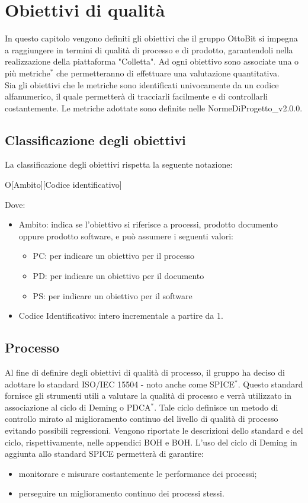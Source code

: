 \section{Obiettivi di qualità}
In questo capitolo vengono definiti gli obiettivi che il gruppo OttoBit si impegna a raggiungere in termini di qualità di processo e di prodotto, garantendoli nella realizzazione della piattaforma "Colletta". Ad ogni obiettivo sono associate una o più metriche$^*$ che permetteranno di effettuare una valutazione quantitativa. \\
Sia gli obiettivi che le metriche sono identificati univocamente da un codice alfanumerico, il quale permetterà di tracciarli facilmente e di controllarli costantemente. Le metriche adottate sono definite nelle NormeDiProgetto\_v2.0.0.

\subsection{Classificazione degli obiettivi}
La classificazione degli obiettivi rispetta la seguente notazione:
\begin{center}
	O[Ambito][Codice identificativo]
\end{center}

Dove:
\begin{itemize}
	\item Ambito: indica se l'obiettivo si riferisce a processi, prodotto documento oppure prodotto software, e può assumere i seguenti valori:
	\begin{itemize}
		\item PC: per indicare un obiettivo per il processo
		\item PD: per indicare un obiettivo per il documento
		\item PS: per indicare un obiettivo per il software
	\end{itemize}
	
	\item Codice Identificativo: intero incrementale a partire da 1.
	
\end{itemize}

\subsection{Processo}
Al fine di definire degli obiettivi di qualità di processo, il gruppo ha deciso di adottare lo standard ISO/IEC 15504 - noto anche come SPICE$^*$. Questo standard fornisce gli strumenti utili a valutare la qualità di processo e verrà utilizzato in associazione al ciclo di Deming o PDCA$^*$. Tale ciclo definisce un metodo di controllo mirato al miglioramento continuo del livello di qualità di processo evitando possibili regressioni. 
Vengono riportate le descrizioni dello standard e del ciclo, rispettivamente, nelle appendici BOH e BOH. 
L'uso del ciclo di Deming in aggiunta allo standard SPICE permetterà di garantire:
\begin{itemize}
	\item monitorare e misurare costantemente le performance dei processi;
	\item perseguire un miglioramento continuo dei processi stessi.
\end{itemize}

